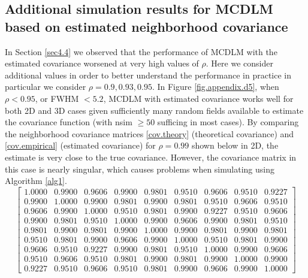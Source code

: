 \documentclass{article}
\begin{document}
\subsection{Additional simulation results for MCDLM based on estimated neighborhood covariance \label{appendix.d5}}
In Section \ref{sec4.4} we observed that the performance of MCDLM with the estimated covariance worsened at very high values of $\rho$. Here we consider additional values in order to better understand the performance in practice in particular we consider $\rho = 0.9, 0.93, 0.95$. In Figure \ref{fig.appendix.d5}, when $\rho < 0.95$, or FWHM $<5.2$, MCDLM with estimated covariance works well for both 2D and 3D cases given sufficiently many random fields available to estimate the covariance function (with nsim $\geq 50$ sufficing in most cases). By comparing the neighborhood covariance matrices \eqref{cov.theory} (theoretical covariance) and \eqref{cov.empirical} (estimated covariance) for $\rho = 0.99$ shown below in 2D, the estimate is very close to the true covariance. However, the covariance matrix in this case is nearly singular, which causes problems when simulating using Algorithm \ref{alg1}. 
\begin{equation}
\label{cov.theory}
\begin{bmatrix}
1.0000 &   0.9900 &   0.9606  &  0.9900   & 0.9801  &  0.9510 &   0.9606  &  0.9510  &  0.9227\\
    0.9900  &  1.0000  &  0.9900  &  0.9801  &  0.9900  &  0.9801 &   0.9510  &  0.9606  &  0.9510\\
    0.9606 &   0.9900  &  1.0000  &  0.9510   & 0.9801 &   0.9900  &  0.9227   & 0.9510  &  0.9606\\
    0.9900  &  0.9801 &   0.9510   & 1.0000   & 0.9900  &  0.9606  &  0.9900  &  0.9801 &   0.9510\\
    0.9801  &  0.9900  &  0.9801 &   0.9900  &  1.0000  &  0.9900   & 0.9801   & 0.9900  &  0.9801\\
    0.9510  &  0.9801 &   0.9900  &  0.9606  &  0.9900  &  1.0000 &   0.9510  &  0.9801 &   0.9900\\
    0.9606  &  0.9510  &  0.9227  &  0.9900  &  0.9801  &  0.9510  &  1.0000  &  0.9900 &   0.9606\\
    0.9510  &  0.9606  &  0.9510  &  0.9801  &  0.9900  &  0.9801  &  0.9900  &  1.0000 &   0.9900\\
0.9227   & 0.9510  &  0.9606  &  0.9510  &  0.9801  &  0.9900 &   0.9606 &   0.9900  & 1.0000

\end{bmatrix}
\end{equation}
\end{document}
